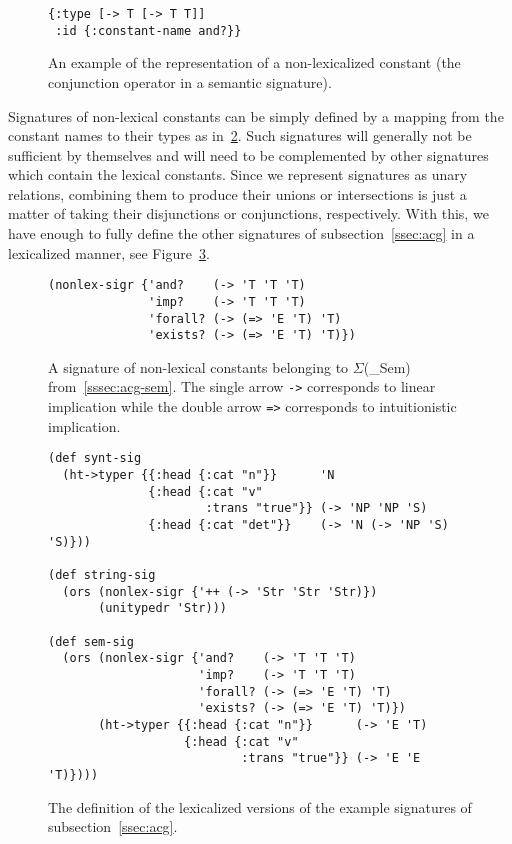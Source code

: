 \begin{figure}
  \centering
\begin{verbatim}
{:type [-> T [-> T T]]
 :id {:constant-name and?}}
\end{verbatim}
  \caption{\label{fig:nonlex-const} An example of the representation of
    a non-lexicalized constant (the conjunction operator in a semantic
    signature).}
\end{figure}

Signatures of non-lexical constants can be simply defined by a mapping
from the constant names to their types as
in~\ref{fig:nonlex-sig-impl}. Such signatures will generally not be
sufficient by themselves and will need to be complemented by other
signatures which contain the lexical constants. Since we represent
signatures as unary relations, combining them to produce their unions or
intersections is just a matter of taking their disjunctions or
conjunctions, respectively. With this, we have enough to fully define
the other signatures of subsection~\ref{ssec:acg} in a lexicalized
manner, see Figure~\ref{fig:example-sig-impl}.

\begin{figure}
  \centering
\begin{verbatim}
(nonlex-sigr {'and?    (-> 'T 'T 'T)
              'imp?    (-> 'T 'T 'T)
              'forall? (-> (=> 'E 'T) 'T)
              'exists? (-> (=> 'E 'T) 'T)})
\end{verbatim}
  \caption{\label{fig:nonlex-sig-impl} A signature of non-lexical
    constants belonging to $\Sigma$(\_{Sem})
    from~\ref{sssec:acg-sem}. The single arrow \texttt{->} corresponds
    to linear implication while the double arrow \texttt{=>} corresponds
    to intuitionistic implication.}
\end{figure}

\begin{figure}
  \centering
\begin{verbatim}
(def synt-sig
  (ht->typer {{:head {:cat "n"}}      'N
              {:head {:cat "v"
                      :trans "true"}} (-> 'NP 'NP 'S)
              {:head {:cat "det"}}    (-> 'N (-> 'NP 'S) 'S)}))

(def string-sig
  (ors (nonlex-sigr {'++ (-> 'Str 'Str 'Str)})
       (unitypedr 'Str)))

(def sem-sig
  (ors (nonlex-sigr {'and?    (-> 'T 'T 'T)
                     'imp?    (-> 'T 'T 'T)
                     'forall? (-> (=> 'E 'T) 'T)
                     'exists? (-> (=> 'E 'T) 'T)})
       (ht->typer {{:head {:cat "n"}}      (-> 'E 'T)
                   {:head {:cat "v"
                           :trans "true"}} (-> 'E 'E 'T)})))
\end{verbatim}
  \caption{\label{fig:example-sig-impl} The definition of the
    lexicalized versions of the example signatures of
    subsection~\ref{ssec:acg}.}
\end{figure}

